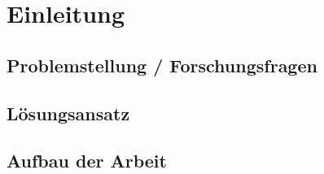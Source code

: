 


\chapter{Einleitung}
\label{sec:Einleitung} %




\section{Problemstellung / Forschungsfragen}

\section{Lösungsansatz}
\label{sec:loesungsansatz}

\section{Aufbau der Arbeit}




 
